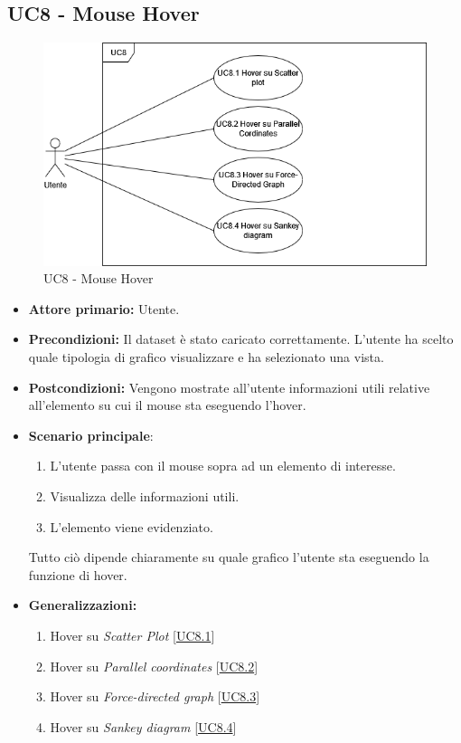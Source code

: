 \subsection{UC8 - Mouse Hover}
\label{sec:UC8}
\begin{figure}[h!]
    \centering
    \includegraphics[scale=0.55]{../../assets/UC8-MouseHover.png}
    \caption{UC8 - Mouse Hover}
\end{figure}
\begin{itemize}
    \item \textbf{Attore primario:} Utente.
    \item \textbf{Precondizioni:} Il dataset è stato caricato correttamente. L'utente ha scelto quale tipologia di grafico visualizzare e ha selezionato una vista.
    \item \textbf{Postcondizioni:} Vengono mostrate all'utente informazioni utili relative all'elemento su cui il mouse sta eseguendo l'hover.
    \item \textbf{Scenario principale}: 
    \begin{enumerate}
		\item L'utente passa con il mouse sopra ad un elemento di interesse. 
		\item Visualizza delle informazioni utili.
		\item L'elemento viene evidenziato. 
	\end{enumerate}
	Tutto ciò dipende chiaramente su quale grafico l'utente sta eseguendo la funzione di hover.
    \item \textbf{Generalizzazioni:} \begin{enumerate}
                                        \item Hover su \textit{Scatter Plot} [\hyperref[sec:UC8.1]{UC8.1}]
                                        \item Hover su \textit{Parallel coordinates} [\hyperref[sec:UC8.2]{UC8.2}]
                                        \item Hover su \textit{Force-directed graph} [\hyperref[sec:UC8.3]{UC8.3}]
                                        \item Hover su \textit{Sankey diagram} [\hyperref[sec:UC8.4]{UC8.4}]
                                    \end{enumerate}
\end{itemize}

